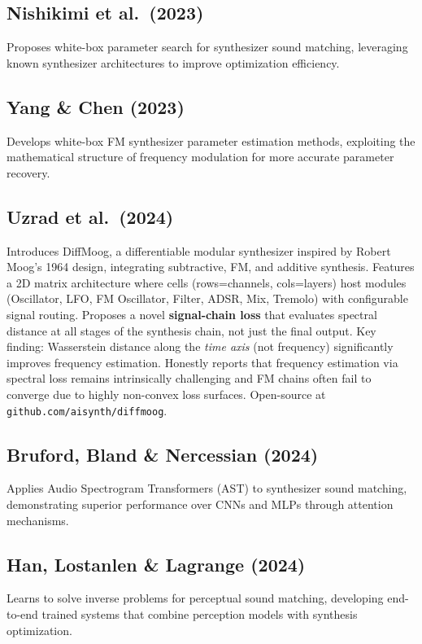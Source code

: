 \documentclass[12pt]{article}
\begin{document}
\subsection*{Nishikimi et al.\ (2023) \cite{Nishikimi2023}}
Proposes white-box parameter search for synthesizer sound matching, leveraging known synthesizer architectures to improve optimization efficiency.

\subsection*{Yang \& Chen (2023) \cite{Yang2023}}
Develops white-box FM synthesizer parameter estimation methods, exploiting the mathematical structure of frequency modulation for more accurate parameter recovery.

\subsection*{Uzrad et al.\ (2024) \cite{Uzrad2024}}
Introduces DiffMoog, a differentiable modular synthesizer inspired by Robert Moog's 1964 design, integrating subtractive, FM, and additive synthesis. Features a 2D matrix architecture where cells (rows=channels, cols=layers) host modules (Oscillator, LFO, FM Oscillator, Filter, ADSR, Mix, Tremolo) with configurable signal routing. Proposes a novel \textbf{signal-chain loss} that evaluates spectral distance at all stages of the synthesis chain, not just the final output. Key finding: Wasserstein distance along the \emph{time axis} (not frequency) significantly improves frequency estimation. Honestly reports that frequency estimation via spectral loss remains intrinsically challenging and FM chains often fail to converge due to highly non-convex loss surfaces. Open-source at \texttt{github.com/aisynth/diffmoog}.

\subsection*{Bruford, Bland \& Nercessian (2024) \cite{Bruford2024}}
Applies Audio Spectrogram Transformers (AST) to synthesizer sound matching, demonstrating superior performance over CNNs and MLPs through attention mechanisms.

\subsection*{Han, Lostanlen \& Lagrange (2024) \cite{10508449}}
Learns to solve inverse problems for perceptual sound matching, developing end-to-end trained systems that combine perception models with synthesis optimization.
\end{document}
